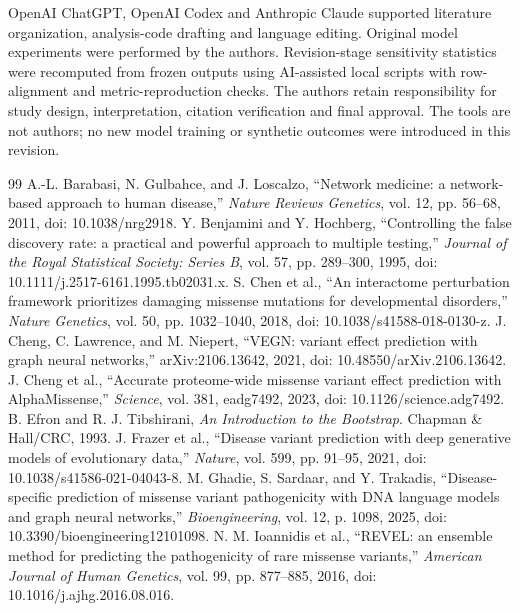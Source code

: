 \documentclass[conference]{IEEEtran}
\begin{document}
OpenAI ChatGPT, OpenAI Codex and Anthropic Claude supported literature organization, analysis-code drafting and language editing. Original model experiments were performed by the authors. Revision-stage sensitivity statistics were recomputed from frozen outputs using AI-assisted local scripts with row-alignment and metric-reproduction checks. The authors retain responsibility for study design, interpretation, citation verification and final approval. The tools are not authors; no new model training or synthetic outcomes were introduced in this revision.

\begin{thebibliography}{99}
 A.-L. Barabasi, N. Gulbahce, and J. Loscalzo, ``Network medicine: a network-based approach to human disease,'' \emph{Nature Reviews Genetics}, vol. 12, pp. 56--68, 2011, doi: 10.1038/nrg2918.
 Y. Benjamini and Y. Hochberg, ``Controlling the false discovery rate: a practical and powerful approach to multiple testing,'' \emph{Journal of the Royal Statistical Society: Series B}, vol. 57, pp. 289--300, 1995, doi: 10.1111/j.2517-6161.1995.tb02031.x.
 S. Chen et al., ``An interactome perturbation framework prioritizes damaging missense mutations for developmental disorders,'' \emph{Nature Genetics}, vol. 50, pp. 1032--1040, 2018, doi: 10.1038/s41588-018-0130-z.
 J. Cheng, C. Lawrence, and M. Niepert, ``VEGN: variant effect prediction with graph neural networks,'' arXiv:2106.13642, 2021, doi: 10.48550/arXiv.2106.13642.
 J. Cheng et al., ``Accurate proteome-wide missense variant effect prediction with AlphaMissense,'' \emph{Science}, vol. 381, eadg7492, 2023, doi: 10.1126/science.adg7492.
 B. Efron and R. J. Tibshirani, \emph{An Introduction to the Bootstrap}. Chapman \& Hall/CRC, 1993.
 J. Frazer et al., ``Disease variant prediction with deep generative models of evolutionary data,'' \emph{Nature}, vol. 599, pp. 91--95, 2021, doi: 10.1038/s41586-021-04043-8.
 M. Ghadie, S. Sardaar, and Y. Trakadis, ``Disease-specific prediction of missense variant pathogenicity with DNA language models and graph neural networks,'' \emph{Bioengineering}, vol. 12, p. 1098, 2025, doi: 10.3390/bioengineering12101098.
 N. M. Ioannidis et al., ``REVEL: an ensemble method for predicting the pathogenicity of rare missense variants,'' \emph{American Journal of Human Genetics}, vol. 99, pp. 877--885, 2016, doi: 10.1016/j.ajhg.2016.08.016.

\end{thebibliography}
\end{document}
